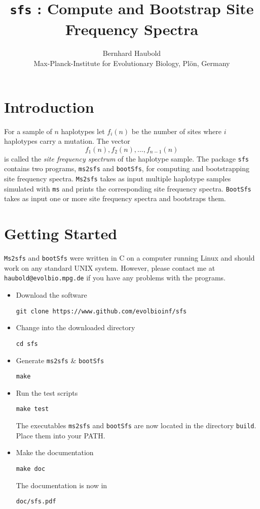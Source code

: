 \documentclass[english,a4paper]{article}
\newcommand{\bi}{\begin{itemize}}
\newcommand{\I}{\item}
\newcommand{\ty}{\texttt}
\begin{document}
\title{\ty{sfs} : Compute and Bootstrap Site Frequency Spectra}
\author{Bernhard Haubold\\\small Max-Planck-Institute for Evolutionary Biology, Pl\"on, Germany}
\date{}
\maketitle
\section{Introduction}
For a sample of $n$ haplotypes let $f_i(n)$ be the number of sites where $i$
haplotypes carry a mutation. The vector
\[
f_1(n), f_2(n),...,f_{n-1}(n)
\]
is called the \textit{site frequency spectrum} of the haplotype sample. The package \ty{sfs}
contains two programs, \ty{ms2sfs} and \ty{bootSfs}, for computing and bootstrapping
site frequency spectra. \ty{Ms2sfs}
takes as input multiple haplotype samples simulated with \ty{ms}
\citep{hud02:gen} and prints the corresponding site frequency
spectra. \ty{BootSfs} takes as input one or more site frequency spectra and
bootstraps them.
\section{Getting Started}
\ty{Ms2sfs}  and \ty{bootSfs} were written in C on a computer running Linux and should
work on any standard UNIX system.
However, please contact me at \ty{haubold@evolbio.mpg.de} if you have any problems with the programs.
\bi
\I Download the software
\begin{verbatim}
git clone https://www.github.com/evolbioinf/sfs
\end{verbatim}
\I Change into the downloaded directory
\begin{verbatim}
cd sfs
\end{verbatim}
\I Generate \ty{ms2sfs} \& \ty{bootSfs}
\begin{verbatim}
make
\end{verbatim}
\I Run the test scripts
\begin{verbatim}
make test
\end{verbatim}
The executables \ty{ms2sfs} and \ty{bootSfs} are now located in the
directory \ty{build}. Place them into your PATH.
\item Make the documentation
\begin{verbatim}
make doc
\end{verbatim}
The documentation is now in
\begin{verbatim}
doc/sfs.pdf
\end{verbatim}
\end{itemize}
\end{document}
